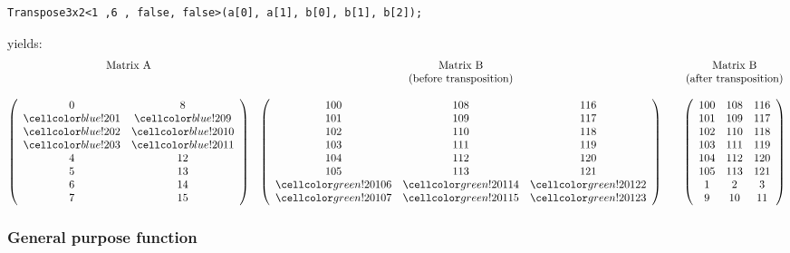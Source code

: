 \vspace{2cm}
\begin{minipage}{\linewidth}
	\begin{verbatim}
Transpose3x2<1 ,6 , false, false>(a[0], a[1], b[0], b[1], b[2]);
	\end{verbatim}
	yields:
	\begin{align*}
	\begin{matrix}
	\textrm{Matrix A} & \textrm{Matrix B}  & & \textrm{Matrix B}\\
	&\textrm{(before transposition)}&&\textrm{(after transposition)}\\
	\\
	\left(\begin{array}{cc}
	0 & 8\\
	\colSrc 1 & \colSrc 9\\
	\colSrc 2 & \colSrc 10\\
	\colSrc 3 & \colSrc 11\\
	4 & 12\\
    5 & 13\\
	6 & 14\\
	7 & 15
	\end{array}\right) 
	&
	\left(\begin{array}{ccc}
	100 & 108 & 116\\
	101 & 109 & 117\\
	102 & 110 & 118\\
	103 & 111 & 119\\
	104 & 112 & 120\\
	105 & 113 & 121\\
	\colTgt 106 & \colTgt 114 & \colTgt 122\\
	\colTgt 107 & \colTgt 115 & \colTgt 123
	\end{array}\right) 
	&&
	\left(\begin{array}{ccc}
    100 & 108 & 116\\
    101 & 109 & 117\\
    102 & 110 & 118\\
    103 & 111 & 119\\
    104 & 112 & 120\\
    105 & 113 & 121\\
    1 & 2 & 3\\
    9 & 10 & 11
\end{array}\right) 
	\end{matrix}
	\end{align*}
\end{minipage}

\subsubsection{General purpose function}
\label{sec:general_transpose_function}

